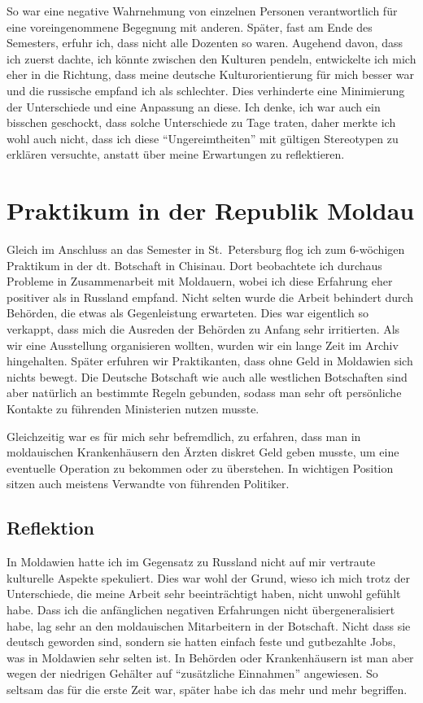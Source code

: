 \documentclass[12pt,headsepline,a4paper]{scrartcl}
\begin{document}
So war eine negative Wahrnehmung von einzelnen Personen verantwortlich für eine voreingenommene Begegnung mit anderen. Später, fast am Ende des Semesters, erfuhr ich, dass  nicht alle Dozenten so waren. Augehend davon, dass ich zuerst dachte, ich könnte zwischen den Kulturen pendeln, entwickelte ich mich eher in die Richtung, dass meine deutsche Kulturorientierung für mich besser war und die russische empfand ich als schlechter. Dies verhinderte eine Minimierung der Unterschiede und eine Anpassung an diese. Ich denke, ich war auch ein bisschen geschockt, dass solche Unterschiede zu Tage traten, daher merkte ich wohl auch nicht, dass ich diese “Ungereimtheiten” mit gültigen Stereotypen zu erklären versuchte, anstatt über meine Erwartungen zu reflektieren.

\section{Praktikum in der Republik Moldau}

Gleich im Anschluss an das Semester in St.\ Petersburg flog ich zum 6-wöchigen Praktikum in der dt. Botschaft in Chisinau. Dort beobachtete ich durchaus Probleme in Zusammenarbeit mit Moldauern, wobei ich diese Erfahrung eher positiver als in Russland empfand. Nicht selten wurde die Arbeit behindert durch Behörden, die etwas als Gegenleistung erwarteten. Dies war eigentlich so verkappt, dass mich die Ausreden der Behörden zu Anfang sehr irritierten. Als wir eine Ausstellung organisieren wollten, wurden wir ein lange Zeit im Archiv hingehalten. Später erfuhren wir Praktikanten, dass ohne Geld in Moldawien sich nichts bewegt. Die Deutsche Botschaft wie auch alle westlichen Botschaften sind aber natürlich an bestimmte Regeln gebunden, sodass man sehr oft persönliche Kontakte zu führenden Ministerien nutzen musste.

Gleichzeitig war es für mich sehr befremdlich, zu erfahren, dass man in moldauischen Krankenhäusern den Ärzten diskret Geld geben musste, um eine eventuelle Operation zu bekommen oder zu überstehen. In wichtigen Position sitzen auch meistens Verwandte von führenden Politiker.
\subsection*{Reflektion}

In Moldawien hatte ich im Gegensatz zu Russland nicht auf mir vertraute kulturelle Aspekte spekuliert. Dies war wohl der Grund, wieso ich mich trotz der Unterschiede, die meine Arbeit sehr beeinträchtigt haben, nicht unwohl gefühlt habe. Dass ich die anfänglichen negativen Erfahrungen nicht übergeneralisiert habe, lag sehr an den moldauischen Mitarbeitern in der Botschaft. Nicht dass sie deutsch geworden sind, sondern sie hatten einfach feste und gutbezahlte Jobs, was in Moldawien sehr selten ist. In Behörden oder Krankenhäusern ist man aber wegen der niedrigen Gehälter auf “zusätzliche Einnahmen” angewiesen. So seltsam das für die erste Zeit war, später habe ich das mehr und mehr begriffen.
\end{document}
